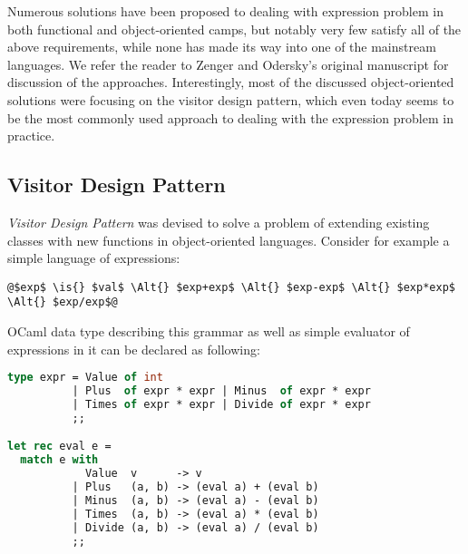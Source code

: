 \noindent
Numerous solutions have been proposed to dealing with expression problem in both 
functional and object-oriented camps, but notably very few satisfy all of the 
above requirements, while none has made its way into one of the mainstream 
languages. We refer the reader to Zenger and Odersky's original  
manuscript for discussion of the approaches\cite{fool12}. Interestingly, most of 
the discussed object-oriented solutions were focusing on the visitor design 
pattern\cite{DesignPatterns1993}, which even today seems to be the most commonly 
used approach to dealing with the expression problem in practice.

\subsection{Visitor Design Pattern}
\label{sec:vdp}


\emph{Visitor Design Pattern}\cite{DesignPatterns1993} was devised to solve a problem 
of extending existing classes with new functions in object-oriented languages. 
Consider for example a simple language of expressions:

\begin{lstlisting}
@$exp$ \is{} $val$ \Alt{} $exp+exp$ \Alt{} $exp-exp$ \Alt{} $exp*exp$ \Alt{} $exp/exp$@
\end{lstlisting}

\noindent
OCaml data type describing this grammar as well as simple evaluator of expressions 
in it can be declared as following:

\begin{lstlisting}[language=Caml,keepspaces,columns=flexible]
type expr = Value of int 
          | Plus  of expr * expr | Minus  of expr * expr 
          | Times of expr * expr | Divide of expr * expr
          ;;

let rec eval e =
  match e with
            Value  v      -> v
          | Plus   (a, b) -> (eval a) + (eval b)
          | Minus  (a, b) -> (eval a) - (eval b)
          | Times  (a, b) -> (eval a) * (eval b)
          | Divide (a, b) -> (eval a) / (eval b)
          ;;
\end{lstlisting}

